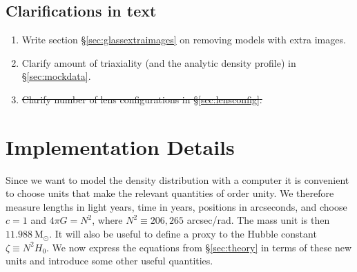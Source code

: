 \documentclass[galley,usenatbib]{mn2e}
\newcommand{\Msun}{\ensuremath{\mathrm{M}_\odot}}
\newcommand{\secref}[1] {\S\ref{#1}}
\begin{document}
\subsection{Clarifications in text}

\begin{enumerate} 

\item Write section \S\ref{sec:glassextraimages} on removing models
  with extra images.

\item Clarify amount of triaxiality (and the analytic density profile)
  in \S\ref{sec:mockdata}.

\item \sout{Clarify number of lens configurations in \S\ref{sec:lensconfig}.}

\end{enumerate}


\appendix

\section{Implementation Details}

Since we want to model the density distribution with a computer it
is convenient to choose units that make the relevant quantities of order
unity.  We therefore measure lengths in light years, time in years, positions
in arcseconds, and choose $c=1$ and $4\pi G = N^2$, where $N^2 \equiv 206,265$
arcsec/rad. The mass unit is then $11.988\ \Msun$. It will also be useful to
define a proxy to the Hubble constant $\zeta \equiv N^2 H_0$. We now 
express the equations from \secref{sec:theory} in terms of these new units
and introduce some other useful quantities.
\end{document}
